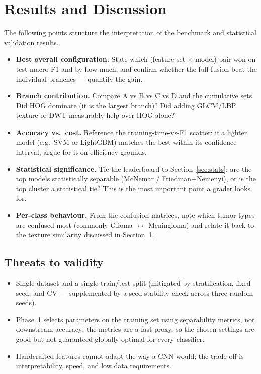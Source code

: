 \section{Results and Discussion}

The following points structure the interpretation of the benchmark and statistical validation
results.

\begin{itemize}[leftmargin=1.4em,itemsep=3pt]
  \item \textbf{Best overall configuration.} State which (feature-set $\times$ model) pair won on test
        macro-F1 and by how much, and confirm whether the full fusion beat the individual branches ---
        quantify the gain.
  \item \textbf{Branch contribution.} Compare A vs B vs C vs D and the cumulative sets. Did HOG
        dominate (it is the largest branch)? Did adding GLCM/LBP texture or DWT measurably help over
        HOG alone?
  \item \textbf{Accuracy vs.\ cost.} Reference the training-time-vs-F1 scatter: if a lighter model
        (e.g.\ SVM or LightGBM) matches the best within its confidence interval, argue for it on
        efficiency grounds.
  \item \textbf{Statistical significance.} Tie the leaderboard to Section~\ref{sec:stats}: are the top
        models statistically separable (McNemar / Friedman+Nemenyi), or is the top cluster a
        statistical tie? This is the most important point a grader looks for.
  \item \textbf{Per-class behaviour.} From the confusion matrices, note which tumor types are confused
        most (commonly Glioma $\leftrightarrow$ Meningioma) and relate it back to the texture
        similarity discussed in Section~1.
\end{itemize}

\subsection{Threats to validity}
\begin{itemize}[leftmargin=1.4em,itemsep=2pt]
  \item Single dataset and a single train/test split (mitigated by stratification, fixed seed, and CV
        --- supplemented by a seed-stability check across three random seeds).
  \item Phase~1 selects parameters on the training set using separability metrics, not downstream
        accuracy; the metrics are a fast proxy, so the chosen settings are good but not guaranteed
        globally optimal for every classifier.
  \item Handcrafted features cannot adapt the way a CNN would; the trade-off is interpretability,
        speed, and low data requirements.
\end{itemize}
